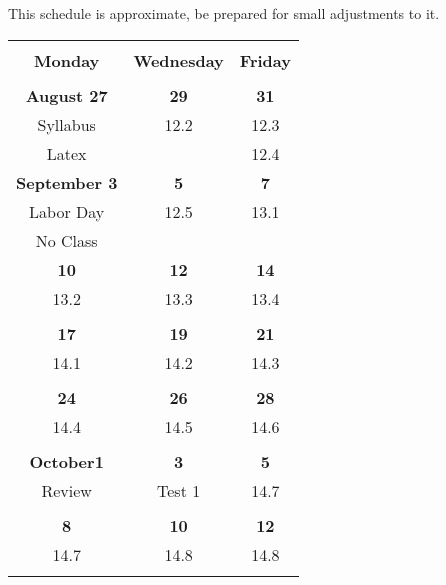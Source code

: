 \documentclass[letterpaper,10pt]{article}
\begin{document}
\begin{center}
This schedule is approximate, be prepared for small adjustments to it.
\begin{tabular}{|c|c|c|} \hline
\hspace{1.5in}  & \hspace{1.5in} & \hspace{1.5in} \\
\bf{Monday}     & \bf{Wednesday} & \bf{Friday}  \\
                            &                &       \\ \hline \hline
 \bf{August} \hfill\bf{27}& \hfill\bf{29}&\hfill\bf{31} \\
 Syllabus & 12.2   &  12.3  \\
 Latex &     &  12.4   \\ \hline

 \bf{September} \hfill \hfill\bf{3} &\hfill\bf{5} & \hfill\bf{7} \\
 Labor Day &  12.5  &  13.1   \\
 No Class &     &   \\ \hline

 \hfill\bf{10} & \hfill\bf{12} & \hfill\bf{14} \\
 13.2 & 13.3 &   13.4    \\
  &  &       \\ \hline
  \hfill\bf{17} &\hfill\bf{19} & \hfill\bf{21} \\
 14.1  & 14.2 &    14.3   \\
  &  &       \\ \hline
 \hfill\bf{24} & \hfill\bf{26} & \hfill\bf{28} \\
   14.4   &   14.5 & 14.6 \\
  &     &     \\ \hline

\bf{October}\hfill\bf{1} & \hfill\bf{3} & \hfill\bf{5} \\
  Review & Test 1 &    14.7   \\
  &  &       \\ \hline
 \hfill\bf{8} &\hfill\bf{10} & \hfill\bf{12} \\
  14.7 & 14.8 &    14.8   \\
  &  &       \\ \hline
  

\end{tabular}
\end{center}
\end{document}
